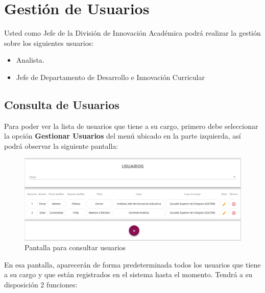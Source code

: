 \clearpage
\section{Gestión de Usuarios}

    Usted como Jefe de la División de  Innovación Académica podrá realizar la gestión sobre los siguientes usuarios:
    \begin{itemize}
        \item Analista.
        \item Jefe de Departamento de Desarrollo e Innovación Curricular
    \end{itemize}


    \subsection{Consulta de Usuarios}
  Para poder ver la lista de usuarios que tiene a su cargo, primero debe seleccionar la opción \textbf{Gestionar Usuarios} del menú ubicado en la parte izquierda, así podrá observar la siguiente pantalla:

  \begin{figure}[H]
  	\centering
  	\hypertarget{consultarUs}{\includegraphics[width=0.6\linewidth]{images/SP5/Consultar-Usuario}}
  	\caption{Pantalla para consultar usuarios}
  	\label{consultarrh}
  \end{figure}

  En esa pantalla, aparecerán de forma predeterminada todos los usuarios que tiene a su cargo y que están registrados en el sistema hasta el momento. Tendrá a su disposición 2 funciones:
  
